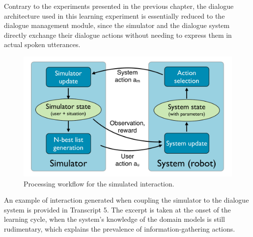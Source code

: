 Contrary to the experiments presented in the previous chapter, the dialogue architecture used in this learning experiment is essentially reduced to the dialogue management module, since the simulator and the dialogue system directly exchange their dialogue actions without needing to express them in actual spoken utterances.   

\begin{figure}[ht]
\begin{center}
\includegraphics[scale=0.3]{imgs/exp2_architecture.pdf}
\end{center} 
\caption{Processing workflow for the simulated interaction.}
\label{fig:exp2_architecture}
\end{figure}

An example of interaction generated when coupling the simulator to the dialogue system is provided in Transcript 5. The excerpt is taken at the onset of the learning cycle, when the system's knowledge of the domain models is still rudimentary, which explains the prevalence of information-gathering actions. 

